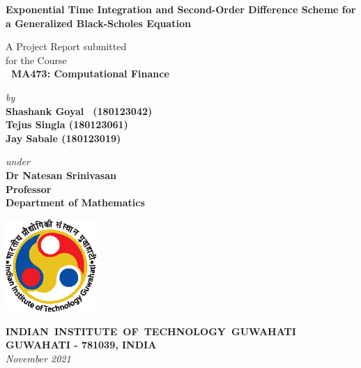 \documentclass[12pt,a4paper]{report}
\theoremstyle{plain}
\theoremstyle{definition}
\theoremstyle{remark}
\begin{document}


\begin{titlepage}
\enlargethispage{3cm}

\begin{center}

\vspace*{-2cm}

\textbf{\Large Exponential Time Integration and Second-Order Difference Scheme for a Generalized Black-Scholes Equation}

\vfill

 A Project Report submitted \\
for the Course \\[1cm]

{\bf\Large\ MA473: Computational Finance }\\[.1in]

 \vfill

{\large \emph{by}}\\[5pt]

{\large\bf {Shashank Goyal \qquad \, (180123042)}}\\[5pt]
{\large\bf {Tejus Singla \qquad \quad \; \; (180123061)}}\\[5pt]
{\large\bf {Jay Sabale \quad \qquad \; \; \; (180123019)}}\\[5pt]

\vfill

{\large \emph{under}}\\[5pt]
{\large\bf Dr Natesan Srinivasan}\\[5pt]
{\large\bf Professor}\\[5pt]
{\large\bf Department of Mathematics}

\vfill
\includegraphics[height=3.5cm]{figures/iitglogo.eps}

\vspace*{0.5cm}

{\bf\large \mbox{INDIAN INSTITUTE OF TECHNOLOGY GUWAHATI}}\\[5pt]
{\bf\large GUWAHATI - 781039, INDIA}\\[10pt]
{\it\large November 2021}
\end{center}

\end{titlepage}
\end{document}
